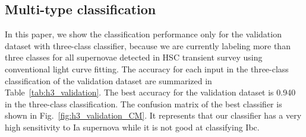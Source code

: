 \documentclass[useamsfonts]{pasj01}
\begin{document}
\subsection{Multi-type classification}
\label{sec:h3}
%
In this paper, we show the classification performance only for the validation dataset with three-class classifier, because we are currently labeling more than three classes for all supernovae detected in HSC transient survey using conventional light curve fitting.
%
The accuracy for each input in the three-class classification of the validation dataset are summarized in Table\ \ref{tab:h3_validation}.
The best accuracy for the validation dataset is 0.940 in the three-class classification.
The confusion matrix of the best classifier is shown in Fig.\ \ref{fig:h3_validation_CM}.
It represents that our classifier has a very high sensitivity to Ia supernova while it is not good at classifying Ibc.
\end{document}
